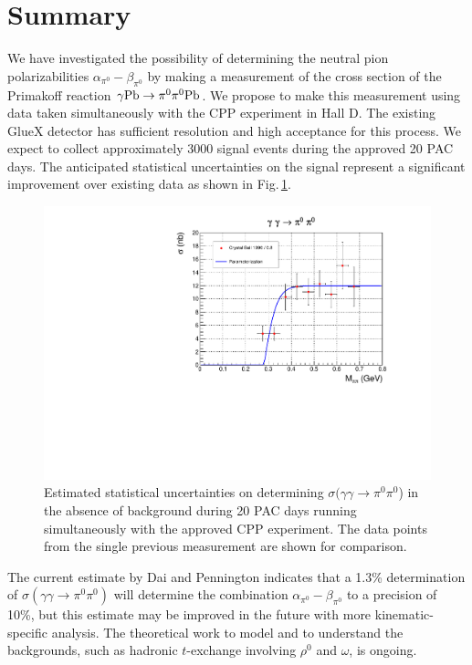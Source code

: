 \section{Summary}

We have investigated the possibility of determining the neutral pion
polarizabilities $\alpha_{\pi^0}-\beta_{\pi^0}$ by making a
measurement of the cross section of the Primakoff reaction $\gamma
\rm{Pb}\rightarrow \pi^0 \pi^0 \rm{Pb}$. We propose to make this
measurement using data taken simultaneously with the CPP\cite{CPPexp}
experiment in Hall D. The existing GlueX detector has sufficient
resolution and high acceptance for this process. We expect to collect approximately 3000 signal events during the
approved 20 PAC days. The anticipated statistical uncertainties on
the signal represent a significant improvement over existing data as shown in Fig.\,\ref{fig:sigma_2pi0_figs_4}.

\begin{figure}[tpb]
\centering
\includegraphics[page=4,width=4.75in]{figures/sigma_2pi0_figs.pdf}
\caption{Estimated statistical uncertainties on determining $\sigma(\gamma\gamma\rightarrow\pi^0\pi^0$) in the absence of background during 20 PAC days running simultaneously with the approved CPP experiment. The data points from the single previous measurement
are shown for comparison.
\label{fig:sigma_2pi0_figs_4}}
\end{figure}

The current estimate by Dai and Pennington \cite{Dai:2016ytz} indicates
that a 1.3\% determination of
$\sigma(\gamma\gamma\rightarrow\pi^0\pi^0)$ will determine the
combination $\alpha_{\pi^0}-\beta_{\pi^0}$ to a precision of 10\%,
but this estimate may be improved in the future with more kinematic-specific analysis. The theoretical work to model and to understand the backgrounds, such as
hadronic $t$-exchange involving $\rho^0$ and $\omega$, is ongoing.
